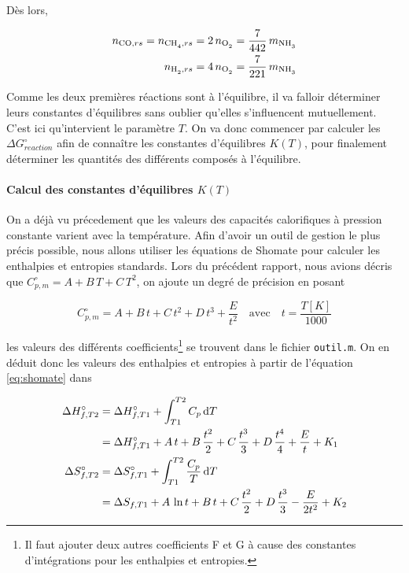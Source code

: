 \documentclass[a4paper, oneside, 12pt]{article}
\begin{document}
Dès lors, 

\begin{align}
	n_{\ce{CO}, rs} = n_{\ce{CH4}, rs} 
	= 2 \, n_{\ce{O2}} = \frac{7}{442} \, m_{\ce{NH3}} 
	\label{eq:moles1_ref_sec} \\
	n_{\ce{H2}, rs} = 4 \, n_{\ce{O2}} = \frac{7}{221} \, m_{\ce{NH3}}
	\label{eq:moles2_ref_sec}
\end{align}

Comme les deux premières réactions sont à l'équilibre,
il va falloir déterminer leurs constantes d'équilibres sans
oublier qu'elles s'influencent mutuellement.
C'est ici qu'intervient le paramètre $T$. On va donc commencer
par calculer les $\Delta G^{\circ}_{reaction}$ afin de conna\^itre les constantes
d'équilibres $K(T)$, pour finalement déterminer les quantités des différents composés
à l'équilibre.

\paragraph{Calcul des constantes d'équilibres $K(T)$}

On a déjà vu précedement que les valeurs des capacités calorifiques
à pression constante varient avec la température. Afin d'avoir un outil de gestion
le plus précis possible, nous allons utiliser les équations de Shomate pour calculer 
les enthalpies et entropies standards. 
Lors du précédent rapport, nous avions décris que $C_{p,m}^{\circ} = A + B \, T + C \, T^2$,
on ajoute un degré de précision en posant

\begin{equation}
	C_{p,m}^{\circ} = A + B \, t + C \, t^2 + D \, t^3 + \frac{E}{t^2}
	\quad \text{avec} \quad t = \frac{T[K]}{1000}
	\label{eq:shomate}
\end{equation}

les valeurs des différents coefficients\footnote{Il faut ajouter deux autres 
coefficients F et G à cause des constantes d'intégrations pour les
enthalpies et entropies.} se trouvent \cite{shomate} dans le fichier \texttt{outil.m}.
On en déduit donc les valeurs des enthalpies et entropies
à partir de l'équation \ref{eq:shomate} dans 

\begin{align*}
	\Delta H_{f, T2}^{\circ} &= \Delta H_{f, T1}^{\circ} 
	+ \int_{T1}^{T2} C_p \, \mathrm{d}T \\ 
				 &= \Delta H_{f, T1}^{\circ} 
	+ A \, t + B \, \frac{t^2}{2}  + C \,  \frac{t^3}{3} 
	+ D \, \frac{t^4}{4} + \frac{E}{t} + K_{1} \\		 
	\Delta S_{f, T2}^{\circ} &= \Delta S_{f, T1}^{\circ} + \int_{T1}^{T2} 
	\frac{C_p}{T} \, \mathrm{d}T \\
				 &= \Delta S_{f, T1} + A \, \ln{t} 
	+ B \, t + C \, \frac{t^2}{2} 
	+ D \, \frac{t^3}{3} - \frac{E}{2 t^{2}} + K_{2} 
\end{align*}
\end{document}
